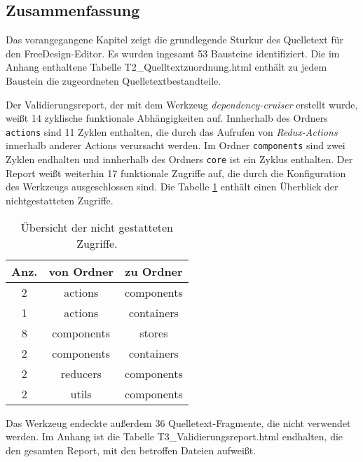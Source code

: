 \subsection{Zusammenfassung}
Das vorangegangene Kapitel zeigt die grundlegende Sturkur des Quelletext für den FreeDesign-Editor. 
Es wurden ingesamt 53 Bausteine identifiziert. Die im Anhang enthaltene Tabelle T2\_Quelltextzuordnung.html enthält zu jedem Baustein die zugeordneten Quelletextbestandteile.  

Der Validierungsreport, der mit dem Werkzeug \emph{dependency-cruiser} erstellt wurde, weißt 14 zyklische funktionale Abhängigkeiten auf.
Innherhalb des Ordners \lstinline|actions| sind 11 Zyklen enthalten, die durch das Aufrufen von \emph{Redux-Actions} innerhalb anderer Actions verursacht werden. 
Im Ordner \lstinline|components| sind zwei Zyklen endhalten und innherhalb des Ordners \lstinline|core| ist ein Zyklus enthalten.
Der Report weißt weiterhin 17 funktionale Zugriffe auf, die durch die Konfiguration des Werkzeugs ausgeschlossen sind. 
Die Tabelle \ref{table:not_allowed} enthält einen Überblick der nichtgestatteten Zugriffe.
\newpage
\begin{table}
    \centering
    \caption{Übersicht der nicht gestatteten Zugriffe.}
    \begin{tabular}{c|c|c}        
        \label{table:not_allowed}
        Anz. & von Ordner & zu Ordner \\
        \hline
        2 & actions & components \\
        1 & actions & containers \\
        8 & components & stores \\
        2 & components & containers \\
        2 & reducers & components \\
        2 & utils & components \\
    \end{tabular}
\end{table}    
 
Das Werkzeug endeckte außerdem 36 Quelletext-Fragmente, die nicht verwendet werden. 
Im Anhang ist die Tabelle T3\_Validierungsreport.html endhalten, die den gesamten Report, mit den betroffen Dateien aufweißt. 




